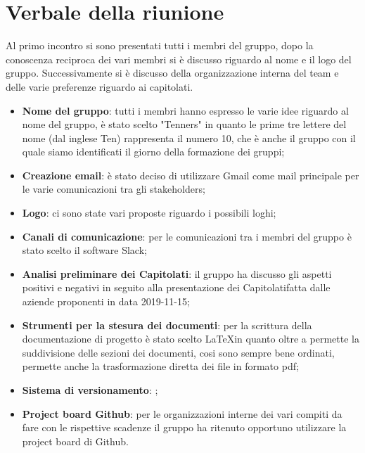 \section{Verbale della riunione}
		Al primo incontro si sono presentati tutti i membri del gruppo, dopo la conoscenza reciproca dei vari membri si è discusso riguardo al nome e il logo del gruppo. Successivamente si è discusso della organizzazione interna del team e delle varie preferenze riguardo ai capitolati\glos. 
	\begin{itemize}
		\item \textbf {Nome del gruppo}: tutti i membri hanno espresso le varie idee riguardo al nome del gruppo, è stato scelto "Tenners" in quanto le prime tre lettere del nome (dal inglese Ten) rappresenta il numero 10, che è anche il gruppo con il quale siamo identificati il giorno della formazione dei gruppi;
		\item \textbf {Creazione email}: è stato deciso di utilizzare Gmail come mail principale per le varie comunicazioni tra gli stakeholders\glos;
		\item \textbf {Logo}: ci sono state vari proposte riguardo i possibili loghi;
		\item \textbf {Canali di comunicazione}: per le comunicazioni tra i membri del gruppo è stato scelto il software Slack\glos;
		\item \textbf {Analisi preliminare dei Capitolati\glos}: il gruppo ha discusso gli aspetti positivi e negativi in seguito alla presentazione dei Capitolati\glo fatta dalle aziende proponenti in data 2019-11-15;
		\item \textbf {Strumenti per la stesura dei documenti}: per la scrittura della documentazione di progetto è stato scelto \LaTeX  in quanto oltre a permette la suddivisione delle sezioni dei documenti, cosi sono sempre bene ordinati, permette anche la trasformazione diretta dei file in formato pdf;
		\item \textbf {Sistema di versionamento}:  ;
		\item \textbf {Project board Github}: per le organizzazioni interne dei vari compiti da fare con le rispettive scadenze il gruppo ha ritenuto opportuno utilizzare la project board di Github.
	\end{itemize}

